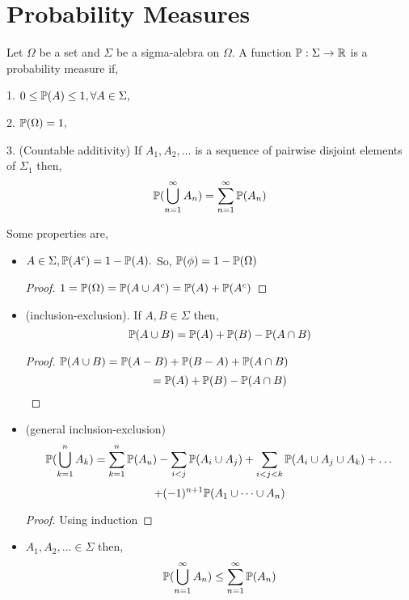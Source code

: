 \section{Probability Measures}

\begin{definition}
    Let $\Omega$ be a set and $\Sigma$ be a sigma-alebra on $\Omega$. A function $\mathbb{P}: \Sigma \rightarrow \R$ is a probability measure if, 

\item 1. $ 0 \le \P(A) \le 1, \forall A \in \Sigma,$
\item 2. $\P(\Omega) = 1,$
\item 3. (Countable additivity) If  $A_1, A_2, \dots$ is a sequence of pairwise disjoint elements of $\Sigma_1$ then, 
    $$ \P(\bigcup_{n=1}^{\infty} A_n) = \sum_{n=1}^{\infty} \P(A_n) $$ 
\end{definition}

Some properties are, 

\begin{itemize}
\item $A \in \Sigma, \P(A^c) = 1 - \P(A).$ So, $\P(\phi) =  1 - \P(\Omega)$
    \begin{proof}
        $1 = \P(\Omega) = \P(A \cup A^c) = \P(A) + \P(A^c)$
    \end{proof}
\item (inclusion-exclusion). If $A,B \in \Sigma$ then, 
$$ \P(A \cup B) = \P(A) + \P(B) - \P(A \cap B) $$ 
\begin{proof}
    $\P(A \cup B) = \P(A - B) + \P(B - A) + \P(A \cap B)$
    $$ = \P(A) + \P(B) - \P(A \cap B) $$ 
\end{proof}

\item (general inclusion-exclusion)
    $$\P(\bigcup_{k=1}^n A_k) = \sum_{k= 1}^n \P(A_u) - \sum_{i < j} \P(A_i \cup A_j) + \sum_{i < j < k}\P(A_i \cup A_j \cup A_k) + \dots $$ 
    $$ + (-1)^{n+1} \P(A_1\cup \dots \cup A_n) $$ 
    \begin{proof}
        Using induction
    \end{proof}

\item $A_1,A_2,\dots \in \Sigma$ then, 
    $$ \P(\bigcup_{n=1}^{\infty} A_n)  \le \sum_{n=1}^\infty \P(A_n)$$ 
\end{itemize}
 

